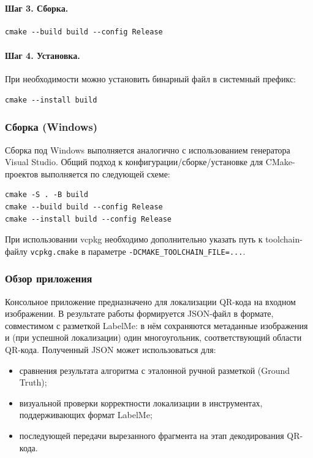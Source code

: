 \paragraph{Шаг 3. Сборка.}
\begin{verbatim}
cmake --build build --config Release
\end{verbatim}

\paragraph{Шаг 4. Установка.}
При необходимости можно установить бинарный файл в системный префикс:
\begin{verbatim}
cmake --install build
\end{verbatim}

\subsubsection{Сборка (Windows)}
Сборка под Windows выполняется аналогично с использованием генератора Visual Studio.
Общий подход к конфигурации/сборке/установке для CMake-проектов выполняется по следующей схеме:
\begin{verbatim}
cmake -S . -B build
cmake --build build --config Release
cmake --install build --config Release
\end{verbatim}
При использовании vcpkg необходимо дополнительно указать путь к toolchain-файлу \texttt{vcpkg.cmake} в параметре \verb|-DCMAKE_TOOLCHAIN_FILE=...|.

\subsubsection{Обзор приложения}

Консольное приложение предназначено для локализации QR-кода на входном изображении.
В результате работы формируется JSON-файл в формате, совместимом с разметкой LabelMe: в нём сохраняются метаданные изображения и (при успешной локализации) один многоугольник, соответствующий области QR-кода.
Полученный JSON может использоваться для:
\begin{itemize}
	\item сравнения результата алгоритма с эталонной ручной разметкой (Ground Truth);
	\item визуальной проверки корректности локализации в инструментах, поддерживающих формат LabelMe;
	\item последующей передачи вырезанного фрагмента на этап декодирования QR-кода.
\end{itemize}

